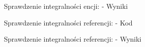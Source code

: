 \begin{figure}[H]
    \centering
    \caption{Sprawdzenie integralności encji: - Wyniki}
\end{figure}
\begin{figure}[H]
    \centering
    \caption{Sprawdzenie integralności referencji: - Kod}
\end{figure}
\begin{figure}[H]
    \centering
    \caption{Sprawdzenie integralności referencji: - Wyniki}
\end{figure}